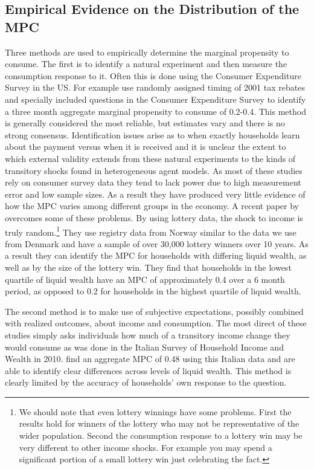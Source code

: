 \documentclass[titlepage]{\econtex}\newcommand{\texname}{IncomeUncertainty}
\begin{document}
\subsection{Empirical Evidence on the Distribution of the MPC}
Three methods are used to empirically determine the marginal propensity to consume. The first is to identify a natural experiment and then measure the consumption response to it. Often this is done using the Consumer Expenditure Survey in the US. For example \cite{johnson_household_2006} use randomly assigned timing of 2001 tax rebates and specially included questions in the Consumer Expenditure Survey to identify a three month aggregate marginal propensity to consume of 0.2-0.4. This method is generally considered the most reliable, but estimates vary and there is no strong consensus. Identification issues arise as to when exactly households learn about the payment versus when it is received and it is unclear the extent to which external validity extends from these natural experiments to the kinds of transitory shocks found in heterogeneous agent models. As most of these studies rely on consumer survey data they tend to lack power due to high measurement error and low sample sizes. As a result they have produced very little evidence of how the MPC varies among different groups in the economy. A recent paper by \cite{fagereng_mpc_2016} overcomes some of these problems. By using lottery data, the shock to income is truly random.\footnote{We should note that even lottery winnings have some problems. First the results hold for winners of the lottery who may not be representative of the wider population. Second the consumption response to a lottery win may be very different to other income shocks. For example you may spend a significant portion of a small lottery win just celebrating the fact.} They use registry data from Norway similar to the data we use from Denmark and have a sample of over 30,000 lottery winners over 10 years. As a result they can identify the MPC for households with differing liquid wealth, as well as by the size of the lottery win. They find that households in the lowest quartile of liquid wealth have an MPC of approximately 0.4 over a 6 month period, as opposed to 0.2 for households in the highest quartile of liquid wealth.

The second method is to make use of subjective expectations, possibly combined with realized outcomes, about income and consumption. The most direct of these studies simply asks individuals how much of a transitory income change they would consume as was done in the Italian Survey of Household Income and Wealth in 2010. \cite{jappelli_fiscal_2014} find an aggregate MPC of 0.48 using this Italian data and are able to identify clear differences across levels of liquid wealth. This method is clearly limited by the accuracy of households' own response to the question.
\end{document}
